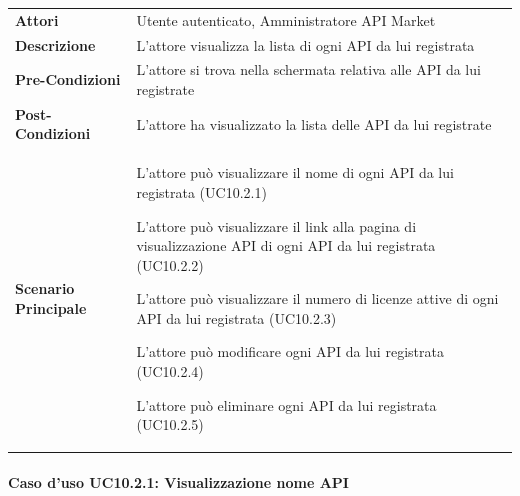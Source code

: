 \begin{minipage}{\linewidth}
	\begin{tabular}{ l | p{11cm}}
		\hline
		\rowcolor{Gray}
		\multicolumn{2}{c}{UC10.2 - Visualizzazione lista API registrate} \\
		\hline
		\textbf{Attori} & Utente autenticato, Amministratore API Market \\
		\textbf{Descrizione} & L'attore visualizza la lista di ogni API da lui registrata \\
		\textbf{Pre-Condizioni} & L'attore si trova nella schermata relativa alle API da lui registrate \\
		\textbf{Post-Condizioni} & L'attore ha visualizzato la lista delle API da lui registrate \\
		\textbf{Scenario Principale} & 
		\begin{enumerate*}[label=(\arabic*.),itemjoin={\newline}]
			\item L'attore può visualizzare il nome di ogni API da lui registrata (UC10.2.1)
			\item L'attore può visualizzare il link alla pagina di visualizzazione API di ogni API da lui registrata (UC10.2.2)
			\item L'attore può visualizzare il numero di licenze attive di ogni API da lui registrata (UC10.2.3)
			\item L'attore può modificare ogni API da lui registrata (UC10.2.4)
			\item L'attore può eliminare ogni API da lui registrata (UC10.2.5)
		\end{enumerate*}\\
	\end{tabular}
\end{minipage}

\paragraph{Caso d'uso UC10.2.1: Visualizzazione nome API}
\label{UC10_2_1}

